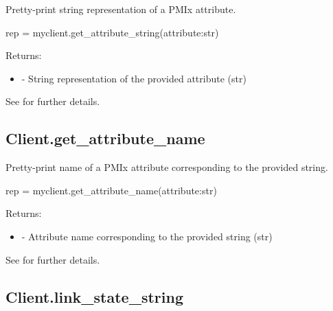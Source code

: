 \summary

Pretty-print string representation of a \ac{PMIx} attribute.

\format

\pyspecificstart
\begin{codepar}
rep = myclient.get_attribute_string(attribute:str)
\end{codepar}
\pyspecificend

\begin{arglist}
\end{arglist}

Returns:
\begin{itemize}
    \item {} - String representation of the provided attribute (str)
\end{itemize}

See  for further details.


\subsection{Client.get_attribute_name}

\summary

Pretty-print name of a \ac{PMIx} attribute corresponding to the provided string.

\format

\pyspecificstart
\begin{codepar}
rep = myclient.get_attribute_name(attribute:str)
\end{codepar}
\pyspecificend

\begin{arglist}
\end{arglist}

Returns:
\begin{itemize}
    \item {} - Attribute name corresponding to the provided string (str)
\end{itemize}

See  for further details.


\subsection{Client.link_state_string}

